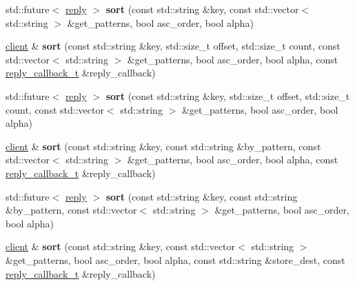 \begin{DoxyCompactItemize}
std\+::future$<$ \mbox{\hyperlink{classcpp__redis_1_1reply}{reply}} $>$ {\bfseries sort} (const std\+::string \&key, const std\+::vector$<$ std\+::string $>$ \&get\+\_\+patterns, bool asc\+\_\+order, bool alpha)
\item 
\mbox{\label{classcpp__redis_1_1client_a11a3ac7152396069a04fa71ff2df587c}} 
\mbox{\hyperlink{classcpp__redis_1_1client}{client}} \& {\bfseries sort} (const std\+::string \&key, std\+::size\+\_\+t offset, std\+::size\+\_\+t count, const std\+::vector$<$ std\+::string $>$ \&get\+\_\+patterns, bool asc\+\_\+order, bool alpha, const \mbox{\hyperlink{classcpp__redis_1_1client_af7a65eb21aa25230bfbb0b0203c4fc04}{reply\+\_\+callback\+\_\+t}} \&reply\+\_\+callback)
\item 
\mbox{\label{classcpp__redis_1_1client_a0fd0dc2b3201ee204a2154aa4f137791}} 
std\+::future$<$ \mbox{\hyperlink{classcpp__redis_1_1reply}{reply}} $>$ {\bfseries sort} (const std\+::string \&key, std\+::size\+\_\+t offset, std\+::size\+\_\+t count, const std\+::vector$<$ std\+::string $>$ \&get\+\_\+patterns, bool asc\+\_\+order, bool alpha)
\item 
\mbox{\label{classcpp__redis_1_1client_a3a443c007c341db12f3d57a2db041092}} 
\mbox{\hyperlink{classcpp__redis_1_1client}{client}} \& {\bfseries sort} (const std\+::string \&key, const std\+::string \&by\+\_\+pattern, const std\+::vector$<$ std\+::string $>$ \&get\+\_\+patterns, bool asc\+\_\+order, bool alpha, const \mbox{\hyperlink{classcpp__redis_1_1client_af7a65eb21aa25230bfbb0b0203c4fc04}{reply\+\_\+callback\+\_\+t}} \&reply\+\_\+callback)
\item 
\mbox{\label{classcpp__redis_1_1client_a5bb3d0f1cedc6cd43a5fb3b8d9574d49}} 
std\+::future$<$ \mbox{\hyperlink{classcpp__redis_1_1reply}{reply}} $>$ {\bfseries sort} (const std\+::string \&key, const std\+::string \&by\+\_\+pattern, const std\+::vector$<$ std\+::string $>$ \&get\+\_\+patterns, bool asc\+\_\+order, bool alpha)
\item 
\mbox{\label{classcpp__redis_1_1client_a583854ebe329581c018441047896cfbc}} 
\mbox{\hyperlink{classcpp__redis_1_1client}{client}} \& {\bfseries sort} (const std\+::string \&key, const std\+::vector$<$ std\+::string $>$ \&get\+\_\+patterns, bool asc\+\_\+order, bool alpha, const std\+::string \&store\+\_\+dest, const \mbox{\hyperlink{classcpp__redis_1_1client_af7a65eb21aa25230bfbb0b0203c4fc04}{reply\+\_\+callback\+\_\+t}} \&reply\+\_\+callback)

\end{DoxyCompactItemize}
